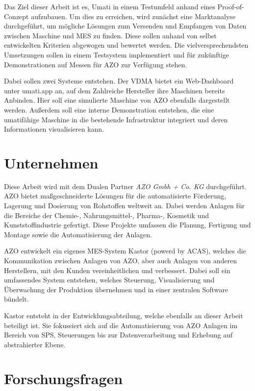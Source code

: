 \documentclass[a4paper, 12pt, oneside, toc=listofnumbered, bibliography=totoc]{scrbook}
\begin{document}
	 Das Ziel dieser Arbeit ist es, \ac{Umati} in einem Testumfeld anhand eines Proof-of-Conzept aufzubauen. Um dies zu erreichen, wird zunächst eine Marktanalyse durchgeführt, um mögliche Lösungen zum Versenden und Empfangen von Daten zwischen Maschine und MES zu finden. Diese sollen anhand von selbst entwickelten Kriterien abgewogen und bewertet werden. Die vielversprechendsten Umsetzungen sollen in einem Testsystem implementiert und für zukünftige Demonstrationen auf Messen für AZO zur Verfügung stehen.
	 
	 Dabei sollen zwei Systeme entstehen. Der VDMA bietet ein Web-Dashboard unter umati.app an, auf dem Zahlreiche Hersteller ihre Maschinen bereits Anbinden. Hier soll eine simulierte Maschine von AZO ebenfalls dargestellt werden. Außerdem soll eine interne Demonstration entstehen, die eine umatifähige Maschine in die bestehende Infrastruktur integriert und deren Informationen visualisieren kann.
	
	\section{Unternehmen}
	
	 Diese Arbeit wird mit dem Dualen Partner \textit{AZO Gmbh + Co. KG} durchgeführt. AZO bietet maßgeschneiderte Lösungen für die automatisierte Förderung, Lagerung und Dosierung von Rohstoffen weltweit an. Dabei werden Anlagen für die Bereiche der Chemie-, Nahrungsmittel-, Pharma-, Kosmetik und Kunststoffindustrie gefertigt. Diese Projekte umfassen die Planung, Fertigung und Montage sowie die Automatisierung der Anlagen.
	 
	 AZO entwickelt ein eigenes MES-System Kastor (powerd by ACAS), welches die Kommunikation zwischen Anlagen von AZO, aber auch Anlagen von anderen Herstellern, mit den Kunden vereinheitlichen und verbessert. Dabei soll ein umfassendes System entstehen, welches Steuerung, Visualisierung und Überwachung der Produktion übernehmen und in einer zentralen Software bündelt.
	 
	 Kastor entsteht in der Entwicklungsabteilung, welche ebenfalls an dieser Arbeit beteiligt ist. Sie fokussiert sich auf die Automatisierung von AZO Anlagen im Bereich von SPS, Steuerungen bis zur Datenverarbeitung und Erhebung auf abstrahierter Ebene. 
	
	\section{Forschungsfragen}
	
\end{document}
